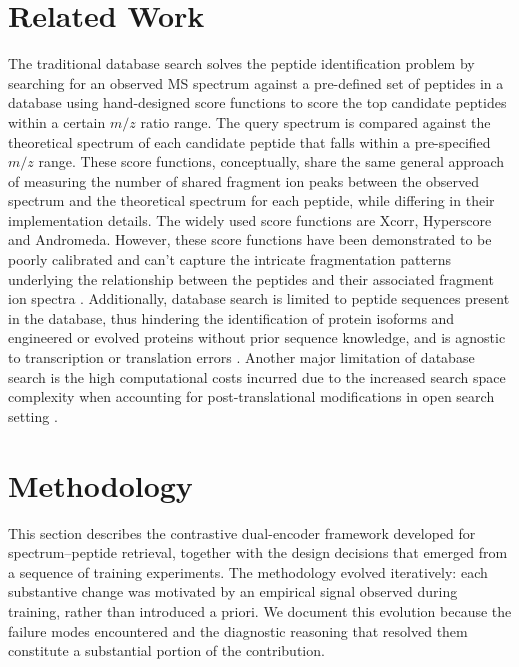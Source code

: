 \documentclass[pdflatex,sn-mathphys-num]{sn-jnl}%
\theoremstyle{thmstyleone}%
\theoremstyle{thmstyletwo}%
\theoremstyle{thmstylethree}%
\begin{document}
\section{Related Work}
\noindent The traditional database search solves the peptide identification problem by searching for an observed MS spectrum against a pre-defined set of peptides in a database using hand-designed score functions to score the top candidate peptides within a certain $m/z$ ratio range. The query spectrum is compared against the theoretical spectrum of each candidate peptide that falls within a pre-specified $m/z$ range. These score functions, conceptually, share the same general approach of measuring the number of shared fragment ion peaks between the observed spectrum and the theoretical spectrum for each peptide, while differing in their implementation details. The widely used score functions are Xcorr, Hyperscore and Andromeda. However, these score functions have been demonstrated to be poorly calibrated \citep{keich2015importance} and can't capture the intricate fragmentation patterns underlying the relationship between the peptides and their associated fragment ion spectra \citep{zolg2018proteometools} \citep{ananth2024learned}. Additionally, database search is limited to peptide sequences present in the database, thus hindering the identification of protein isoforms and engineered or evolved proteins without prior sequence knowledge, and is agnostic to transcription or translation errors \citep{eloff2025instanovo}. Another major limitation of database search is the high computational costs incurred due to the increased search space complexity when accounting for post-translational modifications in open search setting \citep{kong2017msfragger}. 

\section{Methodology}
\label{sec:methodology}

This section describes the contrastive dual-encoder framework developed for spectrum--peptide retrieval, together with the design decisions that emerged from a sequence of training experiments. The methodology evolved iteratively: each substantive change was motivated by an empirical signal observed during training, rather than introduced a priori. We document this evolution because the failure modes encountered and the diagnostic reasoning that resolved them constitute a substantial portion of the contribution.
\end{document}
